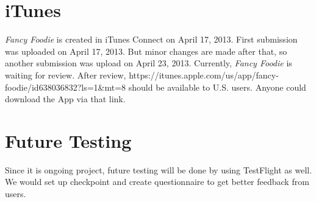 
\section{iTunes} %
\label{sec:itunes}

	\emph{Fancy Foodie} is created in iTunes Connect on April 17, 2013. First submission was uploaded on April 17, 2013. But minor changes are made after that, so another submission was upload on April 23, 2013. Currently, \emph{Fancy Foodie} is waiting for review. After review, https://itunes.apple.com/us/app/fancy-foodie/id638036832?ls=1&mt=8 should be available to U.S. users. Anyone could download the App via that link.

\section{Future Testing} %
\label{sec:future_testing}

Since it is ongoing project, future testing will be done by using TestFlight as well. We would set up checkpoint and create questionnaire to get better feedback from users. 
